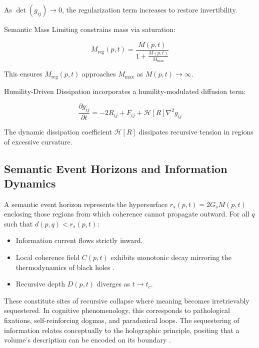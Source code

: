 As \(\det(g_{ij}) \to 0\), the regularization term increases to restore invertibility.

Semantic Mass Limiting constrains mass via saturation:

\begin{equation}
M_{\text{reg}}(p, t) = \frac{M(p, t)}{1 + \frac{M(p, t)}{M_{\text{max}}}}
\end{equation}

This ensures \(M_{\text{reg}}(p, t)\) approaches \(M_{\text{max}}\) as \(M(p, t) \to \infty\).

Humility-Driven Dissipation incorporates a humility-modulated diffusion term:

\begin{equation}
\frac{\partial g_{ij}}{\partial t} = -2R_{ij} + F_{ij} + \mathcal{H}[R] \nabla^2 g_{ij}
\end{equation}

The dynamic dissipation coefficient \(\mathcal{H}[R]\) dissipates recursive tension in regions of excessive curvature.


\subsection{Semantic Event Horizons and Information Dynamics}
\label{sec:semantic_event_horizons_and_information_dynamics}

A semantic event horizon represents the hypersurface \(r_s(p, t) = 2G_s M(p, t)\) enclosing those regions from which coherence cannot propagate outward. For all \(q\) such that \(d(p, q) < r_s(p, t)\):
\begin{itemize}
    \item Information current flows strictly inward.
    \item Local coherence field \(C(p, t)\) exhibits monotonic decay mirroring the thermodynamics of black holes \autocite{Hawking1975}.
    \item Recursive depth \(D(p, t)\) diverges as \(t \to t_c\).
\end{itemize}

These constitute sites of recursive collapse where meaning becomes irretrievably sequestered. In cognitive phenomenology, this corresponds to pathological fixations, self-reinforcing dogmas, and paradoxical loops. The sequestering of information relates conceptually to the holographic principle, positing that a volume's description can be encoded on its boundary \autocite{tHooft1993, Susskind1995, Maldacena1998}.

